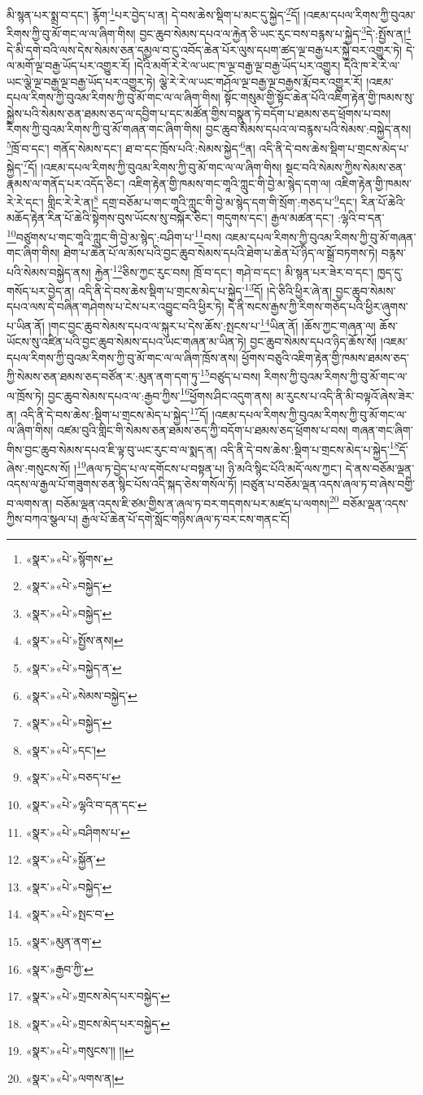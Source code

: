 མི་སྙན་པར་སྨྲ་བ་དང་། རྙོག་\footnote{«སྣར་»«པེ་»སྙོགས་}པར་བྱེད་པ་ན། དེ་བས་ཆེས་སྡིག་པ་མང་དུ་སྐྱེད་\footnote{«སྣར་»«པེ་»བསྐྱེད་}དོ། །འཇམ་དཔལ་རིགས་ཀྱི་བུའམ་རིགས་ཀྱི་བུ་མོ་གང་ལ་ལ་ཞིག་གིས། བྱང་ཆུབ་སེམས་དཔའ་ལ་རྐྱེན་ཅི་ཡང་རུང་བས་བརྙས་པ་སྐྱེད་\footnote{«སྣར་»«པེ་»བསྐྱེད་}དེ་:སྤྱོས་ན།\footnote{«སྣར་»«པེ་»སྤྱོས་ནས།} དེ་མི་དགེ་བའི་ལས་དེས་སེམས་ཅན་དམྱལ་བ་ངུ་འབོད་ཆེན་པོར་ལུས་དཔག་ཚད་ལྔ་བརྒྱ་པར་སྐྱེ་བར་འགྱུར་ཏེ། དེ་ལ་མགོ་ལྔ་བརྒྱ་ཡོད་པར་འགྱུར་རོ། །དེའི་མགོ་རེ་རེ་ལ་ཡང་ཁ་ལྔ་བརྒྱ་ལྔ་བརྒྱ་ཡོད་པར་འགྱུར། དེའི་ཁ་རེ་རེ་ལ་ཡང་ལྕེ་ལྔ་བརྒྱ་ལྔ་བརྒྱ་ཡོད་པར་འགྱུར་ཏེ། ལྕེ་རེ་རེ་ལ་ཡང་གཤོལ་ལྔ་བརྒྱ་ལྔ་བརྒྱས་རྨོ་བར་འགྱུར་རོ། །འཇམ་དཔལ་རིགས་ཀྱི་བུའམ་རིགས་ཀྱི་བུ་མོ་གང་ལ་ལ་ཞིག་གིས། སྟོང་གསུམ་གྱི་སྟོང་ཆེན་པོའི་འཇིག་རྟེན་གྱི་ཁམས་སུ་སྐྱེས་པའི་སེམས་ཅན་ཐམས་ཅད་ལ་དབྱིག་པ་དང་མཚོན་གྱིས་བསྣུན་ཏེ་བདོག་པ་ཐམས་ཅད་ཕྲོགས་པ་བས། རིགས་ཀྱི་བུའམ་རིགས་ཀྱི་བུ་མོ་གཞན་གང་ཞིག་གིས། བྱང་ཆུབ་སེམས་དཔའ་ལ་བརྙས་པའི་སེམས་:བསྐྱེད་ནས། \footnote{«སྣར་»«པེ་»བསྐྱེད་ན་}ཁྲོ་བ་དང་། གནོད་སེམས་དང་། ཐ་བ་དང་ཁྲོས་པའི་:སེམས་སྐྱེད་\footnote{«སྣར་»«པེ་»སེམས་བསྐྱེད་}ན། འདི་ནི་དེ་བས་ཆེས་སྡིག་པ་གྲངས་མེད་པ་སྐྱེད་\footnote{«སྣར་»«པེ་»བསྐྱེད་}དོ། །འཇམ་དཔལ་རིགས་ཀྱི་བུའམ་རིགས་ཀྱི་བུ་མོ་གང་ལ་ལ་ཞིག་གིས། སྡང་བའི་སེམས་ཀྱིས་སེམས་ཅན་རྣམས་ལ་གནོད་པར་འདོད་ཅིང་། འཇིག་རྟེན་གྱི་ཁམས་གང་གཱའི་ཀླུང་གི་བྱེ་མ་སྙེད་དག་ལ། འཇིག་རྟེན་གྱི་ཁམས་རེ་རེ་དང་། གླིང་རེ་རེ་ན།\footnote{«སྣར་»«པེ་»དང་།} དགྲ་བཅོམ་པ་གང་གཱའི་ཀླུང་གི་བྱེ་མ་སྙེད་དག་གི་སྲོག་:གཅད་པ་\footnote{«སྣར་»«པེ་»བཅད་པ་}དང་། རིན་པོ་ཆེའི་མཆོད་རྟེན་རིན་པོ་ཆེའི་སྟེགས་བུས་ཡོངས་སུ་བསྐོར་ཅིང་། གདུགས་དང་། རྒྱལ་མཚན་དང་། :ལྷའི་བ་དན་\footnote{«སྣར་»«པེ་»ལྷའི་བ་དན་དང་}བཙུགས་པ་གང་གཱའི་ཀླུང་གི་བྱེ་མ་སྙེད་:བཤིག་པ་\footnote{«སྣར་»«པེ་»བཤིགས་པ་}བས། འཇམ་དཔལ་རིགས་ཀྱི་བུའམ་རིགས་ཀྱི་བུ་མོ་གཞན་གང་ཞིག་གིས། ཐེག་པ་ཆེན་པོ་ལ་མོས་པའི་བྱང་ཆུབ་སེམས་དཔའི་ཐེག་པ་ཆེན་པོ་ཉིད་ལ་སྒྲོ་བཏགས་ཏེ། བརྙས་པའི་སེམས་བསྐྱེད་ནས། རྐྱེན་\footnote{«སྣར་»«པེ་»སྐྱོན་}ཅིས་ཀྱང་རུང་བས། ཁྲོ་བ་དང་། གཤེ་བ་དང་། མི་སྙན་པར་ཟེར་བ་དང་། ཁྱད་དུ་གསོད་པར་བྱེད་ན། འདི་ནི་དེ་བས་ཆེས་སྡིག་པ་གྲངས་མེད་པ་སྐྱེད་\footnote{«སྣར་»«པེ་»བསྐྱེད་}དོ། །དེ་ཅིའི་ཕྱིར་ཞེ་ན། བྱང་ཆུབ་སེམས་དཔའ་ལས་དེ་བཞིན་གཤེགས་པ་ངེས་པར་འབྱུང་བའི་ཕྱིར་ཏེ། དེ་ནི་སངས་རྒྱས་ཀྱི་རིགས་གཅོད་པའི་ཕྱིར་ཞུགས་པ་ཡིན་ནོ། །གང་བྱང་ཆུབ་སེམས་དཔའ་ལ་སྐུར་པ་དེས་ཆོས་:སྤངས་པ་\footnote{«སྣར་»«པེ་»སྤང་བ་}ཡིན་ནོ། །ཆོས་ཀྱང་གཞན་ལ། ཆོས་ཡོངས་སུ་འཛིན་པའི་བྱང་ཆུབ་སེམས་དཔའ་ཡང་གཞན་མ་ཡིན་ཏེ། བྱང་ཆུབ་སེམས་དཔའ་ཉིད་ཆོས་སོ། །འཇམ་དཔལ་རིགས་ཀྱི་བུའམ་རིགས་ཀྱི་བུ་མོ་གང་ལ་ལ་ཞིག་ཁྲོས་ནས། ཕྱོགས་བཅུའི་འཇིག་རྟེན་གྱི་ཁམས་ཐམས་ཅད་ཀྱི་སེམས་ཅན་ཐམས་ཅད་བཙོན་ར་:མུན་ནག་དག་ཏུ་\footnote{«སྣར་»མུན་ནག་}བཙུད་པ་བས། རིགས་ཀྱི་བུའམ་རིགས་ཀྱི་བུ་མོ་གང་ལ་ལ་ཁྲོས་ཏེ། བྱང་ཆུབ་སེམས་དཔའ་ལ་:རྒྱབ་ཀྱིས་\footnote{«སྣར་»རྒྱབ་ཀྱི་}ཕྱོགས་ཤིང་འདུག་ནས། མ་རུངས་པ་འདི་ནི་མི་བལྟའོ་ཞེས་ཟེར་ན། འདི་ནི་དེ་བས་ཆེས་:སྡིག་པ་གྲངས་མེད་པ་སྐྱེད་\footnote{«སྣར་»«པེ་»གྲངས་མེད་པར་བསྐྱེད་}དོ། །འཇམ་དཔལ་རིགས་ཀྱི་བུའམ་རིགས་ཀྱི་བུ་མོ་གང་ལ་ལ་ཞིག་གིས། འཛམ་བུའི་གླིང་གི་སེམས་ཅན་ཐམས་ཅད་ཀྱི་བདོག་པ་ཐམས་ཅད་ཕྲོགས་པ་བས། གཞན་གང་ཞིག་གིས་བྱང་ཆུབ་སེམས་དཔའ་ཇི་ལྟ་བུ་ཡང་རུང་བ་ལ་སྨད་ན། འདི་ནི་དེ་བས་ཆེས་:སྡིག་པ་གྲངས་མེད་པ་སྐྱེད་\footnote{«སྣར་»«པེ་»གྲངས་མེད་པར་བསྐྱེད་}དོ་ཞེས་:གསུངས་སོ། །\footnote{«སྣར་»«པེ་»གསུངས་།། །།}ཞལ་ཏ་བྱེད་པ་ལ་དགོངས་པ་བསྟན་པ། ཉི་མའི་སྙིང་པོའི་མདོ་ལས་ཀྱང་། དེ་ནས་བཅོམ་ལྡན་འདས་ལ་རྒྱལ་པོ་གཟུགས་ཅན་སྙིང་པོས་འདི་སྐད་ཅེས་གསོལ་ཏོ། །བཙུན་པ་བཅོམ་ལྡན་འདས་ཞལ་ཏ་བ་ཞེས་བགྱི་བ་ལགས་ན། བཅོམ་ལྡན་འདས་ཇི་ཙམ་གྱིས་ན་ཞལ་ཏ་བར་གདགས་པར་མཛད་པ་ལགས།\footnote{«སྣར་»«པེ་»ལགས་ན།} བཅོམ་ལྡན་འདས་ཀྱིས་བཀའ་སྩལ་པ། རྒྱལ་པོ་ཆེན་པོ་དགེ་སློང་གཉིས་ཞལ་ཏ་བར་ངས་གནང་ངོ། 